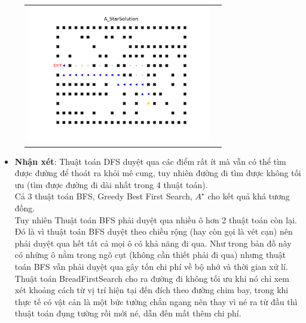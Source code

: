 \documentclass[11pt]{article} %
\begin{document}
\begin{itemize}
\begin{figure}[h]
\begin{tabular}{cc}
				\includegraphics[width=8cm]{Figures/fg1_astar.png}
			\end{tabular}
		\end{figure}
		\begin{itemize}
			\item \textbf{Nhận xét}: Thuật toán DFS duyệt qua các điểm rất ít mà vẫn có thể tìm được đường để thoát ra khỏi mê cung, tuy nhiên đường đi tìm được không tối ưu (tìm được đường đi dài nhất trong 4 thuật toán).\\ Cả 3 thuật toán BFS, Greedy Best First Search, $A^{\star}$ cho kết quả khá tương đồng. \\Tuy nhiên Thuật toán BFS phải duyệt qua nhiều ô hơn 2 thuật toán còn lại. Đó là vì thuật toán BFS duyệt theo chiều rộng (hay còn gọi là vét cạn) nên phải duyệt qua hết tất cả mọi ô có khả năng đi qua. Như trong bản đồ này có những ô nằm trong ngõ cụt (không cần thiết phải đi qua) nhưng thuật toán BFS vẫn phải duyệt qua gây tốn chi phí về bộ nhớ và thời gian xử lí.\\Thuật toán BreadFirstSearch cho ra đường đi không tối ưu khi nó chỉ xem xét khoảng cách từ vị trí hiện tại đến đích theo đường chim bay, trong khi thực tế có vật cản là một bức tường chắn ngang nên thay vì né ra từ đầu thì thuật toán đụng tường rồi mới né, dẫn đến mất thêm chi phí.
		\end{itemize}
	

\end{itemize}
\end{document}
